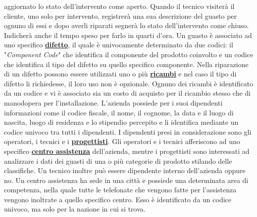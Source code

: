 \documentclass[a4paper, 12pt]{report}
\begin{document}
aggiornato lo stato dell'intervento come aperto. Quando il tecnico visiterà il cliente, uno solo per intervento, registrerà una sua descrizione
del guasto per ognuno di essi e dopo averli riparati segnerà lo stato dell'intervento come chiuso. Indicherà anche il tempo speso per farlo in quarti d'ora.\newline
Un guasto è associato ad uno specifico \textbf{\underline{difetto}}, il quale è univocamente determinato da due codici: il "\textit{Component Code}"
che identifica il componente del prodotto coinvolto e un codice che identifica il tipo del difetto su quello specifico componente. Nella
riparazione di un difetto possono essere utilizzati uno o più \textbf{\underline{ricambi}} e nel caso il tipo di difetto li richiedesse, il loro uso non è opzionale.
Ognuno dei ricambi è identificato da un codice e vi è associato sia un costo di acquisto per il ricambio stesso che di manodopera per l'installazione.\newline
L'azienda possiede per i suoi dipendenti informazioni come il codice fiscale, il nome, il cognome, la data e il luogo di nascita, luogo di
residenza e lo stipendio percepito e li identifica mediante un codice univoco tra tutti i dipendenti. I dipendenti presi in considerazione sono gli operatori, i tecnici e i
\textbf{\underline{progettisti}}. Gli operatori e i tecnici afferiscono ad uno specifico \textbf{\underline{centro assistenza}} dell'azienda,
mentre i progettisti sono interessati ad analizzare i dati dei guasti di una o più categorie di prodotto stilando delle classifiche. Un tecnico
inoltre può essere dipendente interno dell'azienda oppure no.\newline
Un centro assistenza ha sede in una città e possiede una determinata area di competenza, nella quale tutte le telefonate che vengono fatte
per l'assistenza vengono inoltrate a quello specifico centro. Esso è identificato da un codice univoco, ma solo per la nazione in cui si trova.\newline
\end{document}
